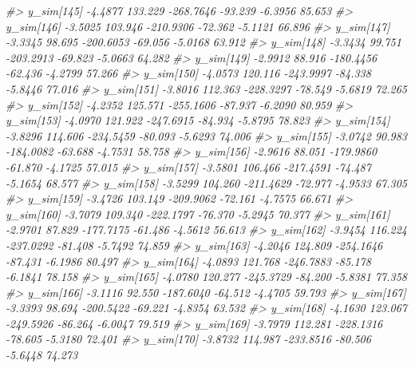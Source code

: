 \documentclass[
  10pt,
  italian,
  a4paper,
  extrafontsizes,onecolumn,openright
  ]{memoir}
\newenvironment{Shaded}{\begin{snugshade}}{\end{snugshade}}
\newcommand{\CommentTok}[1]{\textcolor[rgb]{0.56,0.35,0.01}{\textit{#1}}}
\begin{document}
\begin{Shaded}
\begin{Highlighting}[]
\CommentTok{\#\textgreater{}   y\_sim[145] {-}4.4877 133.229 {-}268.7646 {-}93.239 {-}6.3956 85.653}
\CommentTok{\#\textgreater{}   y\_sim[146] {-}3.5025 103.946 {-}210.9306 {-}72.362 {-}5.1121 66.896}
\CommentTok{\#\textgreater{}   y\_sim[147] {-}3.3345  98.695 {-}200.6053 {-}69.056 {-}5.0168 63.912}
\CommentTok{\#\textgreater{}   y\_sim[148] {-}3.3434  99.751 {-}203.2913 {-}69.823 {-}5.0663 64.282}
\CommentTok{\#\textgreater{}   y\_sim[149] {-}2.9912  88.916 {-}180.4456 {-}62.436 {-}4.2799 57.266}
\CommentTok{\#\textgreater{}   y\_sim[150] {-}4.0573 120.116 {-}243.9997 {-}84.338 {-}5.8446 77.016}
\CommentTok{\#\textgreater{}   y\_sim[151] {-}3.8016 112.363 {-}228.3297 {-}78.549 {-}5.6819 72.265}
\CommentTok{\#\textgreater{}   y\_sim[152] {-}4.2352 125.571 {-}255.1606 {-}87.937 {-}6.2090 80.959}
\CommentTok{\#\textgreater{}   y\_sim[153] {-}4.0970 121.922 {-}247.6915 {-}84.934 {-}5.8795 78.823}
\CommentTok{\#\textgreater{}   y\_sim[154] {-}3.8296 114.606 {-}234.5459 {-}80.093 {-}5.6293 74.006}
\CommentTok{\#\textgreater{}   y\_sim[155] {-}3.0742  90.983 {-}184.0082 {-}63.688 {-}4.7531 58.758}
\CommentTok{\#\textgreater{}   y\_sim[156] {-}2.9616  88.051 {-}179.9860 {-}61.870 {-}4.1725 57.015}
\CommentTok{\#\textgreater{}   y\_sim[157] {-}3.5801 106.466 {-}217.4591 {-}74.487 {-}5.1654 68.577}
\CommentTok{\#\textgreater{}   y\_sim[158] {-}3.5299 104.260 {-}211.4629 {-}72.977 {-}4.9533 67.305}
\CommentTok{\#\textgreater{}   y\_sim[159] {-}3.4726 103.149 {-}209.9062 {-}72.161 {-}4.7575 66.671}
\CommentTok{\#\textgreater{}   y\_sim[160] {-}3.7079 109.340 {-}222.1797 {-}76.370 {-}5.2945 70.377}
\CommentTok{\#\textgreater{}   y\_sim[161] {-}2.9701  87.829 {-}177.7175 {-}61.486 {-}4.5612 56.613}
\CommentTok{\#\textgreater{}   y\_sim[162] {-}3.9454 116.224 {-}237.0292 {-}81.408 {-}5.7492 74.859}
\CommentTok{\#\textgreater{}   y\_sim[163] {-}4.2046 124.809 {-}254.1646 {-}87.431 {-}6.1986 80.497}
\CommentTok{\#\textgreater{}   y\_sim[164] {-}4.0893 121.768 {-}246.7883 {-}85.178 {-}6.1841 78.158}
\CommentTok{\#\textgreater{}   y\_sim[165] {-}4.0780 120.277 {-}245.3729 {-}84.200 {-}5.8381 77.358}
\CommentTok{\#\textgreater{}   y\_sim[166] {-}3.1116  92.550 {-}187.6040 {-}64.512 {-}4.4705 59.793}
\CommentTok{\#\textgreater{}   y\_sim[167] {-}3.3393  98.694 {-}200.5422 {-}69.221 {-}4.8354 63.532}
\CommentTok{\#\textgreater{}   y\_sim[168] {-}4.1630 123.067 {-}249.5926 {-}86.264 {-}6.0047 79.519}
\CommentTok{\#\textgreater{}   y\_sim[169] {-}3.7979 112.281 {-}228.1316 {-}78.605 {-}5.3180 72.401}
\CommentTok{\#\textgreater{}   y\_sim[170] {-}3.8732 114.987 {-}233.8516 {-}80.506 {-}5.6448 74.273}

\end{Highlighting}
\end{Shaded}
\end{document}
